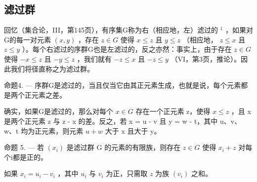 \subsection{滤过群}

回忆（集合论，III，第145页），有序集G称为右（相应地，左）滤过的 \(^{1}\) ，如果对G的每一对元素 \((x, y)\) ，存在 \(z \in G\) 使得 \(x \leqslant z\) 且 \(y \leqslant z\) （相应地， \(z \leqslant x\) 且 \(z \leqslant y\) ）。每个右滤过的序群G也是左滤过的，反之亦然：事实上，由于存在 \(z \in G\) 使得 \(-x \leqslant z\) 且 \(-y \leqslant z\) ，我们就有 \(-z \leqslant x\) 且 \(-z \leqslant y\) （VI，第3页，推论）。因此我们将径直称之为滤过群。

命题4. --- 序群G是滤过的，当且仅当它由其正元素生成，也就是说，每个元素都是两个正元素之差。

确实，如果G是滤过的，那么对每个 \(x \in G\) 存在一个正元素 z，使得 \(x \leqslant z\) ，且 x 是两个正元素 z 与 z - x 的差。反之，若 x = u - v 且 y = w - t，其中 u、v、w、t 均为正元素，则元素 \(u + w\) 大于 x 且大于 y。

命题 5. --- 若 \((x_i)\) 是滤过群 G 的元素的有限族，则存在 \(z \in G\) 使得 \(x_i + z\) 对每个i都是正的。

如果 \(x_{i} = u_{i} - v_{i}\) ，其中 \(u_{i}\) 与 \(v_{i}\) 为正，只需取 \(z\) 为族 \((v_{i})\) 之和。

